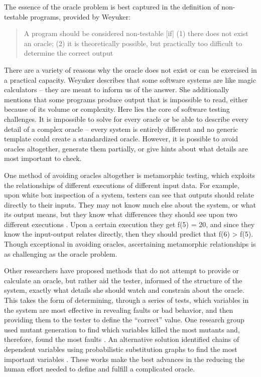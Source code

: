 The essence of the oracle problem is best captured in the definition of non-testable programs, provided by Weyuker:
\begin{quote}
A program should be considered non-testable [if] (1) there does not exist an oracle; (2) it is theoretically possible, but practically too difficult to determine the correct output~\cite{Chays:2000:FTD:347636.348954}
\end{quote}
There are a variety of reasons why the oracle does not exist or can be exercised in a practical capacity. Weyuker describes that some software systems are like magic calculators – they are meant to inform us of the answer. She additionally mentions that some programs produce output that is impossible to read, either because of its volume or complexity. Here lies the core of software testing challenges. It is impossible to solve for every oracle or be able to describe every detail of a complex oracle – every system is entirely different and no generic template could create a standardized oracle. However, it is possible to avoid oracles altogether, generate them partially, or give hints about what details are most important to check.

One method of avoiding oracles altogether is metamorphic testing, which exploits the relationships of different executions of different input data. For example, upon white box inspection of a system, testers can see that outputs should relate directly to their inputs. They may not know much else about the system, or what its output means, but they know what differences they should see upon two different executions . Upon a certain execution they get f(5) = 20, and since they know the input-output relates directly, then they should predict that f(6) > f(5). Though exceptional in avoiding oracles, ascertaining metamorphic relationships is as challenging as the oracle problem.

Other researchers have proposed methods that do not attempt to provide or calculate an oracle, but rather aid the tester, informed of the structure of the system, exactly what details she should watch and constrain about the oracle. This takes the form of determining, through a series of tests, which variables in the system are most effective in revealing faults or bad behavior, and then providing them to the tester to define the ``correct'' value. One research group used mutant generation to find which variables killed the most mutants and, therefore, found the most faults . An alternative solution identified chains of dependent variables using probabilistic substitution graphs to find the most important variables . These works make the best advances in the reducing the human effort needed to define and fulfill a complicated oracle.

